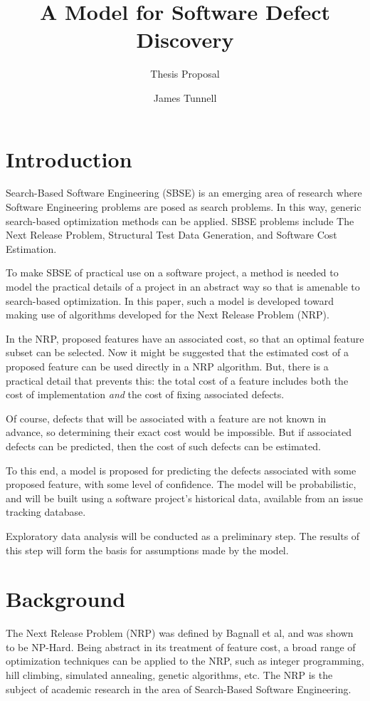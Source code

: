 \documentclass[a4paper]{scrartcl}
\begin{document}
\title{A Model for Software Defect Discovery}
\subtitle{Thesis Proposal}
\author{James Tunnell}
\maketitle

\section{Introduction}
Search-Based Software Engineering (SBSE) is an emerging area of research where Software Engineering problems are posed as search problems. In this way, generic search-based optimization methods can be applied. SBSE problems include The Next Release Problem, Structural Test Data Generation, and Software Cost Estimation\cite{harman2012search}.

To make SBSE of practical use on a software project, a method is needed to model the practical details of a project in an abstract way so that is amenable to search-based optimization. In this paper, such a model is developed toward making use of algorithms developed for the Next Release Problem (NRP).

In the NRP, proposed features have an associated cost, so that an optimal feature subset can be selected. Now it might be suggested that the estimated cost of a proposed feature can be used directly in a NRP algorithm. But, there is a practical detail that prevents this: the total cost of a feature includes both the cost of implementation \emph{and} the cost of fixing associated defects.

Of course, defects that will be associated with a feature are not known in advance, so determining their exact cost would be impossible. But if associated defects can be predicted, then the cost of such defects can be estimated.

To this end, a model is proposed for predicting the defects associated with some proposed feature, with some level of confidence. The model will be probabilistic, and will be built using a software project's historical data, available from an issue tracking database.

Exploratory data analysis will be conducted as a preliminary step. The results of this step will form the basis for assumptions made by the model. 

\section{Background}
The Next Release Problem (NRP) was defined by Bagnall et al\cite{bagnall2001next}, and was shown to be NP-Hard. Being abstract in its treatment of feature cost, a broad range of optimization techniques can be applied to the NRP, such as integer programming, hill climbing, simulated annealing, genetic algorithms, etc. The NRP is the subject of academic research in the area of Search-Based Software Engineering\cite{zhang2007multi,xuan2012solving,jiang2010hybrid}.
\end{document}

